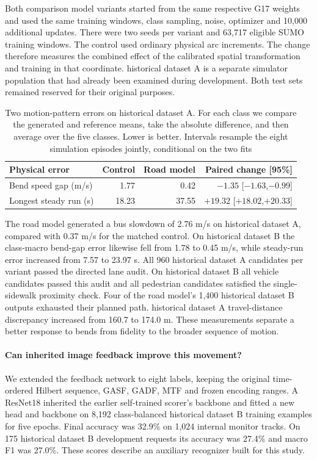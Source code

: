 Both comparison model variants started from the same respective G17 weights and used the same training windows, class sampling, noise, optimizer and 10,000 additional updates. There were two seeds per variant and 63,717 eligible SUMO training windows. The control used ordinary physical arc increments. The change therefore measures the combined effect of the calibrated spatial transformation and training in that coordinate. historical dataset A is a separate simulator population that had already been examined during development. Both test sets remained reserved for their original purposes.

\begin{table}[htbp]\centering\small
\caption{Two motion-pattern errors on historical dataset A. For each class we compare the generated and reference means, take the absolute difference, and then average over the five classes. Lower is better. Intervals resample the eight simulation episodes jointly, conditional on the two fits}
\begin{tabular}{lrrr}\toprule
Physical error & Control & Road model & Paired change [95\%]\\\midrule
Bend speed gap (m/s) & 1.77 & 0.42 & $-1.35$ [$-1.63$,$-0.99$]\\
Longest steady run (s) & 18.23 & 37.55 & $+19.32$ [$+18.02$,$+20.33$]\\\bottomrule
\end{tabular}
\end{table}

The road model generated a bus slowdown of 2.76 m/s on historical dataset A, compared with 0.37 m/s for the matched control. On historical dataset B the class-macro bend-gap error likewise fell from 1.78 to 0.45 m/s, while steady-run error increased from 7.57 to 23.97 s. All 960 historical dataset A candidates per variant passed the directed lane audit. On historical dataset B all vehicle candidates passed this audit and all pedestrian candidates satisfied the single-sidewalk proximity check. Four of the road model's 1,400 historical dataset B outputs exhausted their planned path. historical dataset A travel-distance discrepancy increased from 160.7 to 174.0 m. These measurements separate a better response to bends from fidelity to the broader sequence of motion.

\paragraph{Can inherited image feedback improve this movement?}
We extended the feedback network to eight labels, keeping the original time-ordered Hilbert sequence, GASF, GADF, MTF and frozen encoding ranges. A ResNet18 inherited the earlier self-trained scorer's backbone and fitted a new head and backbone on 8,192 class-balanced historical dataset B training examples for five epochs. Final accuracy was 32.9\% on 1,024 internal monitor tracks. On 175 historical dataset B development requests its accuracy was 27.4\% and macro F1 was 27.0\%. These scores describe an auxiliary recognizer built for this study.

